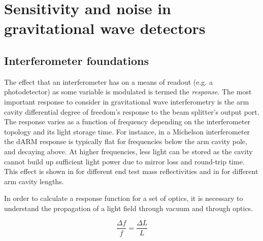 \chapter{Sensitivity and noise in gravitational wave detectors}
\label{c:instrumentation}


\section{Interferometer foundations}
The effect that an interferometer has on a means of readout (e.g. a photodetector) as some variable is modulated is termed the \emph{response}. The most important response to consider in gravitational wave interferometry is the arm cavity differential degree of freedom's response to the beam splitter's output port. The response varies as a function of frequency depending on the interferometer topology and its light storage time. For instance, in a Michelson interferometer the dARM response is typically flat for frequencies below the arm cavity pole, and decaying  above. At higher frequencies, less light can be stored as the cavity cannot build up sufficient light power due to mirror loss and round-trip time. This effect is shown in  for different end test mass reflectivities and in  for different arm cavity lengths.

In order to calculate a response function for a set of optics, it is necessary to understand the propagation of a light field through vacuum and through optics.


\begin{equation}
  \label{eq:freq-to-length}
  \frac{\Delta f}{f} = \frac{\Delta L}{L}
\end{equation}

